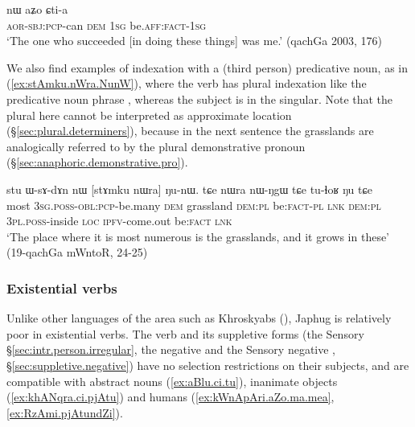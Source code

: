 \begin{exe}
\ex \label{ex:pWkWcha.nW}
\gll [pɯ-kɯ-cʰa] nɯ aʑo ɕti-a \\
\textsc{aor}-\textsc{sbj}:\textsc{pcp}-can \textsc{dem} \textsc{1sg} be.\textsc{aff}:\textsc{fact}-\textsc{1sg} \\
\glt `The one who succeeded [in doing these things] was me.' (qachGa 2003, 176)
\end{exe}

We also find examples of indexation with a (third person) predicative noun, as in (\ref{ex:stAmku.nWra.NunW}), where the verb has plural indexation like the predicative noun phrase , whereas the subject is in the singular. Note that the plural  here cannot be interpreted as approximate location (§\ref{sec:plural.determiners}), because in the next sentence the grasslands are analogically referred to by the plural demonstrative pronoun  (§\ref{sec:anaphoric.demonstrative.pro}).

\begin{exe}
\ex \label{ex:stAmku.nWra.NunW}
\gll  stu ɯ-sɤ-dɤn nɯ [stɤmku nɯra] ŋu-nɯ. tɕe nɯra nɯ-ŋgɯ tɕe tu-ɬoʁ ŋu tɕe \\
most \textsc{3sg}.\textsc{poss}-\textsc{obl}:\textsc{pcp}-be.many \textsc{dem} grassland \textsc{dem}:\textsc{pl} be:\textsc{fact}-\textsc{pl} \textsc{lnk} \textsc{dem}:\textsc{pl} \textsc{3pl}.\textsc{poss}-inside \textsc{loc} \textsc{ipfv}-come.out be:\textsc{fact} \textsc{lnk} \\
\glt `The place where it is most numerous is the grasslands, and it grows in these' (19-qachGa mWntoR, 24-25)
\end{exe}

\subsubsection{Existential verbs} \label{sec:existential.basic}
Unlike other languages of the area such as Khroskyabs (\citealt[250--252]{lai17khroskyabs}), Japhug is relatively poor in existential verbs. The verb  and its suppletive forms (the Sensory  §\ref{sec:intr.person.irregular}, the negative  and the Sensory negative ,  §\ref{sec:suppletive.negative}) have no selection restrictions on their  subjects, and are compatible  with abstract nouns (\ref{ex:aBlu.ci.tu}), inanimate objects (\ref{ex:khANqra.ci.pjAtu}) and  humans (\ref{ex:kWnApAri.aZo.ma.mea}, \ref{ex:RzAmi.pjAtundZi}).

